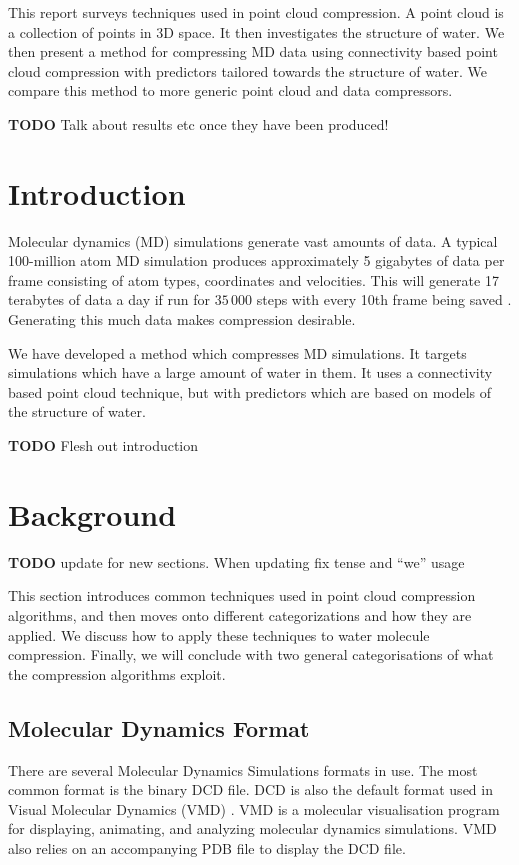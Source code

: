 \documentclass{report}
\newcommand{\todo}{\textbf{TODO} }
\begin{document}
This report surveys techniques used in point cloud compression. A point cloud
is a collection of points in 3D space. It then investigates the structure of
water. We then present a method for compressing MD data using connectivity
based point cloud compression with predictors tailored towards the structure
of water. We compare this method to more generic point cloud and data
compressors.

\todo Talk about results etc once they have been produced!

\tableofcontents

\chapter{Introduction}

Molecular dynamics (MD) simulations generate vast amounts of data. A typical
100-million atom MD simulation produces approximately 5 gigabytes of data per
frame consisting of atom types, coordinates and velocities. This will generate
17 terabytes of data a day if run for $35\,000$ steps with every 10th frame
being saved \citep{omeltchenko2000sls}. Generating this much data makes
compression desirable.

We have developed a method which compresses MD simulations. It targets
simulations which have a large amount of water in them. It uses a connectivity
based point cloud technique, but with predictors which are based on models of
the structure of water.

\todo Flesh out introduction

\chapter{Background}

\todo update for new sections. When updating fix tense and ``we'' usage

This section introduces common techniques used in point cloud compression
algorithms, and then moves onto different categorizations and how they are
applied. We discuss how to apply these techniques to water molecule
compression. Finally, we will conclude with two general categorisations of
what the compression algorithms exploit.

\section{Molecular Dynamics Format}
\label{sec:molec-dynam-form}

There are several Molecular Dynamics Simulations formats in use. The most
common format is the binary DCD file. DCD is also the default format used in
Visual Molecular Dynamics (VMD) \citep{vmd}. VMD is a molecular visualisation
program for displaying, animating, and analyzing molecular dynamics
simulations. VMD also relies on an accompanying PDB file to display the DCD
file.
\end{document}
